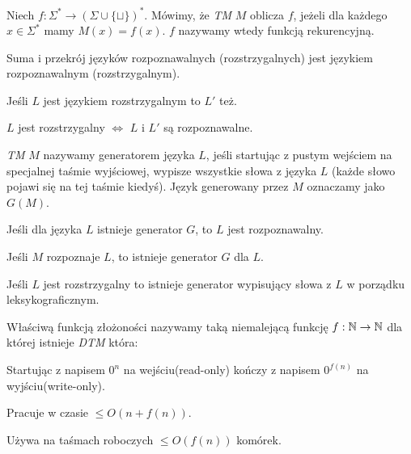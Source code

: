 \begin{definicja}
    Niech $f : \Sigma^{*} \rightarrow {(\Sigma \cup \{\sqcup\})}^{*}$.
    Mówimy, że \textit{TM} $M$ oblicza $f$, jeżeli dla każdego $x \in \Sigma^{*}$ mamy $M(x) = f(x)$.
    $f$ nazywamy wtedy funkcją rekurencyjną.
\end{definicja}
\begin{lemat}
    Suma i przekrój języków rozpoznawalnych (rozstrzygalnych) jest językiem rozpoznawalnym (rozstrzygalnym).
\end{lemat}
\begin{lemat}
    Jeśli $L$ jest językiem rozstrzygalnym to $L'$ też.
\end{lemat}
\begin{lemat}
    $L$ jest rozstrzygalny $\Leftrightarrow$ $L$ i $L'$ są rozpoznawalne.
\end{lemat}
\begin{definicja}
    \textit{TM} $M$ nazywamy generatorem języka $L$, jeśli startując z pustym wejściem na specjalnej taśmie wyjściowej,
    wypisze wszystkie słowa z języka $L$ (każde słowo pojawi się na tej taśmie kiedyś).
    Język generowany przez $M$ oznaczamy jako $G(M)$.
\end{definicja}
\begin{lemat}
    Jeśli dla języka $L$ istnieje generator $G$, to $L$ jest rozpoznawalny.
\end{lemat}
\begin{lemat}
    Jeśli $M$ rozpoznaje $L$, to istnieje generator $G$ dla $L$.
\end{lemat}
\begin{lemat}
    Jeśli $L$ jest rozstrzygalny to istnieje generator wypisujący słowa z $L$
    w porządku leksykograficznym.
\end{lemat}
\begin{definicja}
    Właściwą funkcją złożoności nazywamy taką niemalejącą funkcję $f: \mathbb{N} \rightarrow \mathbb{N}$
    dla której istnieje \textit{DTM} która:
    \begin{enumerate*}[label=\roman*)]
        \item Startując z napisem $0^n$ na wejściu(read-only) kończy z napisem $0^{f(n)}$ na wyjściu(write-only).
        \item Pracuje w czasie $\leq O(n + f(n))$.
        \item Używa na taśmach roboczych $\leq O(f(n))$ komórek.
    \end{enumerate*}
\end{definicja}
